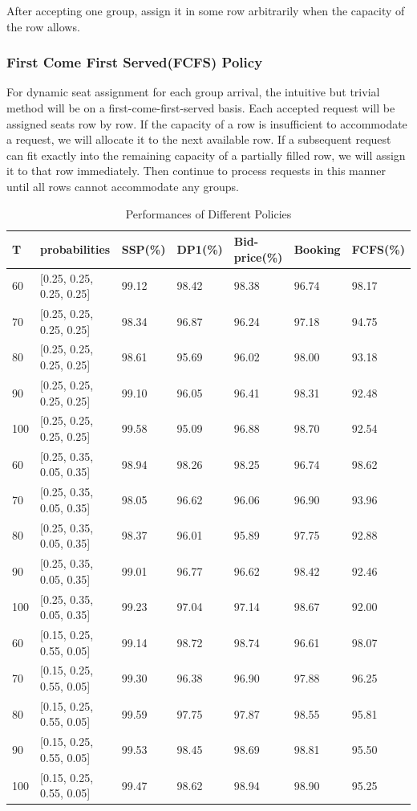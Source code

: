After accepting one group, assign it in some row arbitrarily when the capacity of the row allows.

\subsubsection{First Come First Served(FCFS) Policy}\label{largest_pattern}
For dynamic seat assignment for each group arrival, the intuitive but trivial method will be on a first-come-first-served basis. Each accepted request will be assigned seats row by row. If the capacity of a row is insufficient to accommodate a request, we will allocate it to the next available row. If a subsequent request can fit exactly into the remaining capacity of a partially filled row, we will assign it to that row immediately. Then continue to process requests in this manner until all rows cannot accommodate any groups.

\begin{table}[ht]
  \centering
  \caption{Performances of Different Policies}
  \begin{tabular}{|l|l|l|l|l|l|l|}
  \hline
   T & probabilities & SSP(\%) & DP1(\%) & Bid-price(\%) & Booking & FCFS(\%) \\
  \hline
   60  & [0.25, 0.25, 0.25, 0.25]  & 99.12 & 98.42 & 98.38 & 96.74 & 98.17 \\
   70  & [0.25, 0.25, 0.25, 0.25]  & 98.34 & 96.87 & 96.24 & 97.18 & 94.75 \\
   80  & [0.25, 0.25, 0.25, 0.25]  & 98.61 & 95.69 & 96.02 & 98.00 & 93.18 \\
   90  & [0.25, 0.25, 0.25, 0.25]  & 99.10 & 96.05 & 96.41 & 98.31 & 92.48 \\
   100 & [0.25, 0.25, 0.25, 0.25]  & 99.58 & 95.09 & 96.88 & 98.70 & 92.54 \\
   \hline
   60  & [0.25, 0.35, 0.05, 0.35]  & 98.94 & 98.26 & 98.25 & 96.74 & 98.62 \\
   70  & [0.25, 0.35, 0.05, 0.35]  & 98.05 & 96.62 & 96.06 & 96.90 & 93.96 \\
   80  & [0.25, 0.35, 0.05, 0.35]  & 98.37 & 96.01 & 95.89 & 97.75 & 92.88 \\
   90  & [0.25, 0.35, 0.05, 0.35]  & 99.01 & 96.77 & 96.62 & 98.42 & 92.46 \\
   100 & [0.25, 0.35, 0.05, 0.35]  & 99.23 & 97.04 & 97.14 & 98.67 & 92.00 \\
  \hline
  60  & [0.15, 0.25, 0.55, 0.05]  & 99.14 & 98.72 & 98.74 & 96.61 & 98.07 \\
  70  & [0.15, 0.25, 0.55, 0.05]  & 99.30 & 96.38 & 96.90 & 97.88 & 96.25 \\
  80  & [0.15, 0.25, 0.55, 0.05]  & 99.59 & 97.75 & 97.87 & 98.55 & 95.81 \\
  90  & [0.15, 0.25, 0.55, 0.05]  & 99.53 & 98.45 & 98.69 & 98.81 & 95.50 \\
  100 & [0.15, 0.25, 0.55, 0.05]  & 99.47 & 98.62 & 98.94 & 98.90 & 95.25 \\
  \hline
  \end{tabular}
\end{table}

